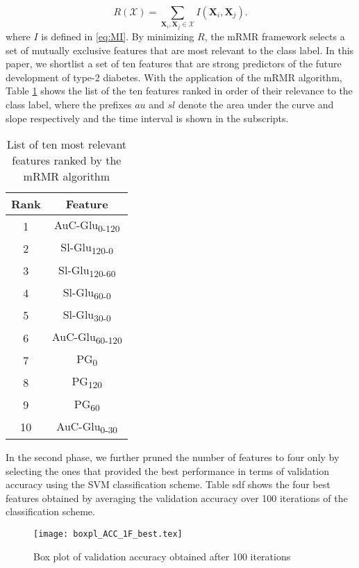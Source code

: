 \documentclass[journal,comsoc]{IEEEtran}
\begin{document}
%
\begin{equation}
  R(\mathcal X) = \sum_{\mathbf{X}_i, \mathbf{X}_j \in \mathcal{X}} I(\mathbf{X}_i, \mathbf{X}_j).
  \label{eq:R}
\end{equation}
%
where $I$ is defined in \eqref{eq:MI}. By minimizing $R$, the mRMR framework selects a set of mutually exclusive features that are most relevant to the class label. In this paper, we shortlist a set of ten features that are strong predictors of the future development of type-2 diabetes. With the application of the mRMR algorithm, Table \ref{tab:ranked} shows the list of the ten features ranked in order of their relevance to the class label, where the prefixes $au$ and $sl$ denote the area under the curve and slope respectively and the time interval is shown in the subscripts.
%
\begin{table}[!b]
  \caption{List of ten most relevant features ranked by the mRMR algorithm}
  \centering
  \begin{tabular}{c c}
    \toprule
    Rank &  Feature\\
    \midrule \midrule
    1 & AuC-Glu\textsubscript{0-120}\\
    2 & Sl-Glu\textsubscript{120-0}\\
    3 & Sl-Glu\textsubscript{120-60}\\
    4 & Sl-Glu\textsubscript{60-0}\\
    5 & Sl-Glu\textsubscript{30-0}\\
    6 & AuC-Glu\textsubscript{60-120}\\
    7 & PG\textsubscript{0}\\
    8 & PG\textsubscript{120}\\
    9 & PG\textsubscript{60} \\
    10 & AuC-Glu\textsubscript{0-30}\\
    \bottomrule
  \end{tabular}
  \label{tab:ranked}
\end{table}
%
In the second phase, we further pruned the number of features to four only by selecting the ones that provided the best performance in terms of validation accuracy using the SVM classification scheme. Table sdf shows the four best features obtained by averaging the validation accuracy over \num{100} iterations of the classification scheme.
%
\begin{figure}[!h]
  \centering
  {\texttt{[image: boxpl\_ACC\_1F\_best.tex]}}
  \caption{Box plot of validation accuracy obtained after \num{100} iterations}
  \label{fig:best_features}
\end{figure}
\end{document}
